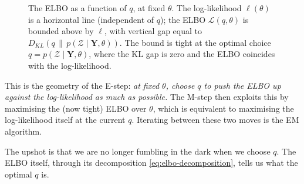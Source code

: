 \documentclass[11pt, a4paper, oneside]{article}
\newcommand{\mY}{\mathbf{Y}}
\begin{document}
\begin{figure}[h!]
\centering
{}
\caption{The ELBO as a function of $q$, at fixed $\theta$. The
log-likelihood $\ell(\theta)$ is a horizontal line (independent of
$q$); the ELBO $\mathcal{L}(q, \theta)$ is bounded above by $\ell$,
with vertical gap equal to $D_{KL}(q \,\|\, p(\mathcal{Z} \mid \mY, \theta))$.
The bound is tight at the optimal choice $q = p(\mathcal{Z} \mid \mY, \theta)$,
where the KL gap is zero and the ELBO coincides with the
log-likelihood.}
\label{fig:elbo-gap}
\end{figure}

\noindent
This is the geometry of the E-step: \emph{at fixed $\theta$, choose $q$
to push the ELBO up against the log-likelihood as much as possible.}
The M-step then exploits this by maximising the (now tight) ELBO over
$\theta$, which is equivalent to maximising the log-likelihood itself
at the current $q$. Iterating between these two moves is the EM
algorithm.

The upshot is that we are no longer fumbling in the dark when we choose
$q$. The ELBO itself, through its decomposition
\eqref{eq:elbo-decomposition}, tells us what the optimal $q$ is.

\newpage
\end{document}
